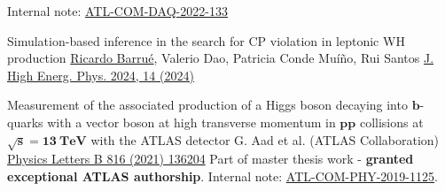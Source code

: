 


\begin{cventries}

    \begin{cventries}
        {
            Internal note: \href{https://cds.cern.ch/record/2845056}{ATL-COM-DAQ-2022-133}
        }
    \end{cventries}

    \cventry
    {Simulation-based inference in the search for CP violation in leptonic WH production}
    {\underline{Ricardo Barrué}, Valerio Dao, Patricia Conde Muíño, Rui Santos}
    {}
    {\href{https://doi.org/10.1007/JHEP04(2024)014}{J. High Energ. Phys. 2024, 14 (2024)}}
    {
    }%

    \cventry
    {Measurement of the associated production of a Higgs boson decaying into $\mathbf{b}$-quarks with a vector boson at high transverse momentum in $\mathbf{pp}$ collisions at $\mathbf{\sqrt{s}= 13 \:\text{TeV}}$ with the ATLAS detector}
    {G. Aad et al. (ATLAS Collaboration)}
    {}
    {\href{https://doi.org/10.1016/j.physletb.2021.136204}{Physics Letters B 816 (2021) 136204}}
    {
        Part of master thesis work - \textbf{granted exceptional ATLAS authorship}. Internal note: \href{https://cds.cern.ch/record/2688371}{ATL-COM-PHY-2019-1125}.
    }
    
\end{cventries}

